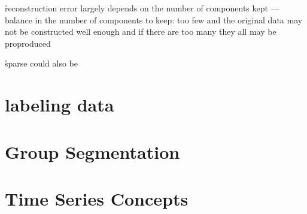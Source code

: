 \r{reconstruction error largely depends on the number of components kept --- balance in the number of components to keep: too few and the original data may not be constructed well enough and if there are too many they all may be proproduced}

\r{sparse could also be }



\section{labeling data}


\section{Group Segmentation}


\section{Time Series Concepts}







